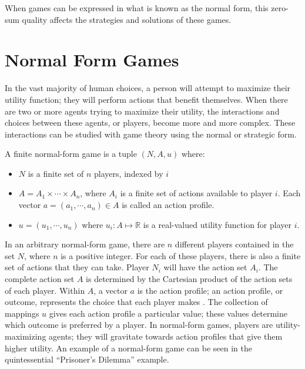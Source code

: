 When games can be expressed in what is known as the normal form, this zero-sum quality affects the strategies and solutions of these games.

\section{Normal Form Games}
In the vast majority of human choices, a person will attempt to maximize their utility function; they will perform actions that benefit themselves. When there are two or more agents trying to maximize their utility, the interactions and choices between these agents, or players, become more and more complex. These interactions can be studied with game theory using the normal or strategic form.
\begin{define}
  A finite normal-form game is a tuple $(N, A, u)$ where:
  \begin{itemize}
  \item $N$ is a finite set of $n$ players, indexed by $i$
  \item $A=A_1\times\cdots\times A_n$, where $A_i$ is a finite set of actions available to player $i$. Each vector $a=(a_1,\cdots ,a_n)\in A$ is called an action profile.
    \item $u=(u_1,\cdots ,u_n)$ where $u_i : A \mapsto\mathbb{R}$ is a real-valued utility function for player $i$. \cite{shoh09}
\end{itemize}
\end{define}

In an arbitrary normal-form game, there are $n$ different players contained in the set $N$, where $n$ is a positive integer. For each of these players, there is also a finite set of actions that they can take. Player $N_i$ will have the action set $A_i$. The complete action set $A$ is determined by the Cartesian product of the action sets of each player. Within $A$, a vector $a$ is the action profile; an action profile, or outcome, represents the choice that each player makes \cite{osbo94}. The collection of mappings $u$ gives each action profile a particular value; these values determine which outcome is preferred by a player. In normal-form games, players are utility-maximizing agents; they will gravitate towards action profiles that give them higher utility. An example of a normal-form game can be seen in the quintessential ``Prisoner's Dilemma'' example.\\

